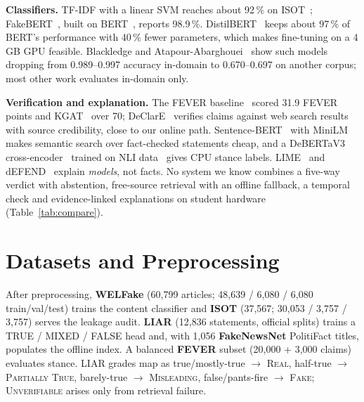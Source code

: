 \documentclass[conference]{IEEEtran}
\newcommand{\cls}[1]{\textsc{#1}}          %
\begin{document}
\textbf{Classifiers.} TF-IDF with a linear SVM reaches about 92\,\% on ISOT~\cite{ahmed2017isot}; FakeBERT~\cite{kaliyar2021fakebert}, built on BERT~\cite{devlin2019bert}, reports 98.9\,\%. DistilBERT~\cite{sanh2019distilbert} keeps about 97\,\% of BERT's performance with 40\,\% fewer parameters, which makes fine-tuning on a 4\,GB GPU feasible. Blackledge and Atapour-Abarghouei~\cite{blackledge2021transforming} show such models dropping from 0.989--0.997 accuracy in-domain to 0.670--0.697 on another corpus; most other work evaluates in-domain only.

\textbf{Verification and explanation.} The FEVER baseline~\cite{thorne2018fever} scored 31.9 FEVER points and KGAT~\cite{liu2020kgat} over 70; DeClarE~\cite{popat2018declare} verifies claims against web search results with source credibility, close to our online path. Sentence-BERT~\cite{reimers2019sbert} with MiniLM~\cite{wang2020minilm} makes semantic search over fact-checked statements cheap, and a DeBERTaV3 cross-encoder~\cite{he2023debertav3} trained on NLI data~\cite{williams2018mnli} gives CPU stance labels. LIME~\cite{ribeiro2016lime} and dEFEND~\cite{shu2019defend} explain \emph{models}, not facts. No system we know combines a five-way verdict with abstention, free-source retrieval with an offline fallback, a temporal check and evidence-linked explanations on student hardware (Table~\ref{tab:compare}).

\section{Datasets and Preprocessing}\label{sec:data}

After preprocessing, \textbf{WELFake} (60{,}799 articles; 48{,}639 / 6{,}080 / 6{,}080 train/val/test) trains the content classifier and \textbf{ISOT} (37{,}567; 30{,}053 / 3{,}757 / 3{,}757) serves the leakage audit. \textbf{LIAR} (12{,}836 statements, official splits) trains a TRUE / MIXED / FALSE head and, with 1{,}056 \textbf{FakeNewsNet} PolitiFact titles, populates the offline index. A balanced \textbf{FEVER} subset (20{,}000 + 3{,}000 claims) evaluates stance. LIAR grades map as true/mostly-true $\rightarrow$ \cls{Real}, half-true $\rightarrow$ \cls{Partially True}, barely-true $\rightarrow$ \cls{Misleading}, false/pants-fire $\rightarrow$ \cls{Fake}; \cls{Unverifiable} arises only from retrieval failure.
\end{document}
